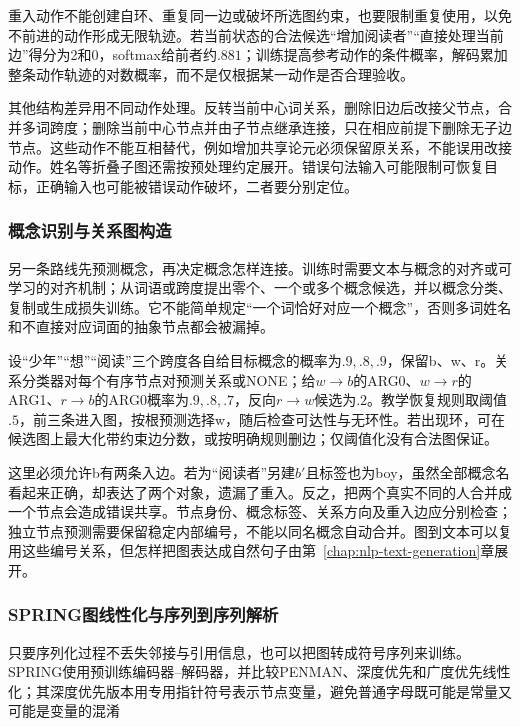 重入动作不能创建自环、重复同一边或破坏所选图约束，也要限制重复使用，以免不前进的动作形成无限轨迹。若当前状态的合法候选“增加阅读者”“直接处理当前边”得分为2和0，softmax给前者约$.881$；训练提高参考动作的条件概率，解码累加整条动作轨迹的对数概率，而不是仅根据某一动作是否合理验收。

其他结构差异用不同动作处理。反转当前中心词关系，删除旧边后改接父节点，合并多词跨度；删除当前中心节点并由子节点继承连接，只在相应前提下删除无子边节点。这些动作不能互相替代，例如增加共享论元必须保留原关系，不能误用改接动作。姓名等折叠子图还需按预处理约定展开。错误句法输入可能限制可恢复目标，正确输入也可能被错误动作破坏，二者要分别定位。

\subsubsection{概念识别与关系图构造}
\label{sec:nlp-analysis-amr-node-edge}

另一条路线先预测概念，再决定概念怎样连接。训练时需要文本与概念的对齐或可学习的对齐机制；从词语或跨度提出零个、一个或多个概念候选，并以概念分类、复制或生成损失训练。它不能简单规定“一个词恰好对应一个概念”，否则多词姓名和不直接对应词面的抽象节点都会被漏掉。

设“少年”“想”“阅读”三个跨度各自给目标概念的概率为$.9,.8,.9$，保留b、w、r。关系分类器对每个有序节点对预测关系或NONE；给$w\to b$的ARG0、$w\to r$的ARG1、$r\to b$的ARG0概率为$.9,.8,.7$，反向$r\to w$候选为$.2$。教学恢复规则取阈值$.5$，前三条进入图，按根预测选择w，随后检查可达性与无环性。若出现环，可在候选图上最大化带约束边分数，或按明确规则删边；仅阈值化没有合法图保证。

这里必须允许b有两条入边。若为“阅读者”另建$b'$且标签也为boy，虽然全部概念名看起来正确，却表达了两个对象，遗漏了重入。反之，把两个真实不同的人合并成一个节点会造成错误共享。节点身份、概念标签、关系方向及重入边应分别检查；独立节点预测需要保留稳定内部编号，不能以同名概念自动合并。图到文本可以复用这些编号关系，但怎样把图表达成自然句子由第~\ref{chap:nlp-text-generation}章展开。

\subsubsection{SPRING图线性化与序列到序列解析}
\label{sec:nlp-analysis-spring}

只要序列化过程不丢失邻接与引用信息，也可以把图转成符号序列来训练。SPRING使用预训练编码器--解码器，并比较PENMAN、深度优先和广度优先线性化；其深度优先版本用专用指针符号表示节点变量，避免普通字母既可能是常量又可能是变量的混淆

